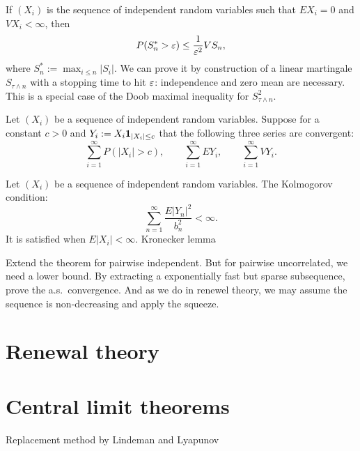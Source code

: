 \documentclass{../../large}
\begin{document}
\begin{prb}
If $(X_i)$ is the sequence of independent random variables such that $EX_i=0$ and $VX_i<\infty$, then
\[P(S^*_n>\varepsilon)\le\frac1{\varepsilon^2}VS_n,\]
where $S^*_n:=\max_{i\le n}|S_i|$.
We can prove it by construction of a linear martingale $S_{\tau\wedge n}$ with a stopping time to hit $\varepsilon$: independence and zero mean are necessary.
This is a special case of the Doob maximal inequality for $S_{\tau\wedge n}^2$.
\end{prb}


\begin{prb}
Let $(X_i)$ be a sequence of independent random variables.
Suppose for a constant $c>0$ and $Y_i:=X_i\mathbf{1}_{|X_i|\le c}$  that the following three series are convergent:
\[\sum_{i=1}^\infty P(|X_i|>c),\qquad\sum_{i=1}^\infty EY_i,\qquad\sum_{i=1}^\infty VY_i.\]
\end{prb}

\begin{prb}
Let $(X_i)$ be a sequence of independent random variables.
The Kolmogorov condition:
\[\sum_{n=1}^\infty\frac{E|Y_n|^2}{b_n^2}<\infty.\]
It is satisfied when $E|X_i|<\infty$.
Kronecker lemma
\end{prb}


\begin{prb}
Extend the theorem for pairwise independent.
But for pairwise uncorrelated, we need a lower bound.
By extracting a exponentially fast but sparse subsequence, prove the a.s.~convergence.
And as we do in renewel theory, we may assume the sequence is non-decreasing and apply the squeeze.
\end{prb}

\section{Renewal theory}





\section{Central limit theorems}

\begin{prb}
Replacement method by Lindeman and Lyapunov
\end{prb}
\end{document}

